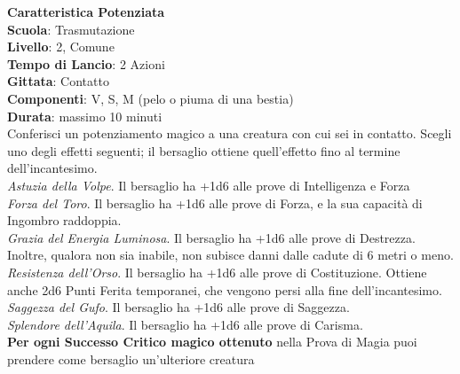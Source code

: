 \begin{multicols}{2}
\medskip\textbf{Caratteristica Potenziata}\\
\textbf{Scuola}: Trasmutazione\\
\textbf{Livello}: 2, Comune\\
\textbf{Tempo di Lancio}: 2 Azioni\\
\textbf{Gittata}: Contatto\\
\textbf{Componenti}: V, S, M (pelo o piuma di una bestia)\\
\textbf{Durata}: massimo 10 minuti\\
Conferisci un potenziamento magico a una creatura con cui sei in contatto. Scegli uno degli effetti seguenti; il bersaglio ottiene quell'effetto fino al termine dell'incantesimo.\\
\textit{Astuzia della Volpe}. Il bersaglio ha +1d6 alle prove di Intelligenza e Forza\\
\textit{Forza del Toro}. Il bersaglio ha +1d6 alle prove di Forza, e la sua capacità di Ingombro raddoppia.\\
\textit{Grazia del Energia Luminosa}. Il bersaglio ha +1d6 alle prove di Destrezza. Inoltre, qualora non sia inabile, non subisce danni dalle cadute di 6 metri o meno.\\
\textit{Resistenza dell'Orso}. Il bersaglio ha +1d6 alle prove di Costituzione. Ottiene anche 2d6 Punti Ferita temporanei, che vengono persi alla fine dell'incantesimo.\\
\textit{Saggezza del Gufo}. Il bersaglio ha +1d6 alle prove di Saggezza. \\
\textit{Splendore dell'Aquila}. Il bersaglio ha +1d6 alle prove di Carisma.\\
\textbf{Per ogni Successo Critico magico ottenuto} nella Prova di Magia puoi prendere come bersaglio un'ulteriore creatura


\end{multicols}
